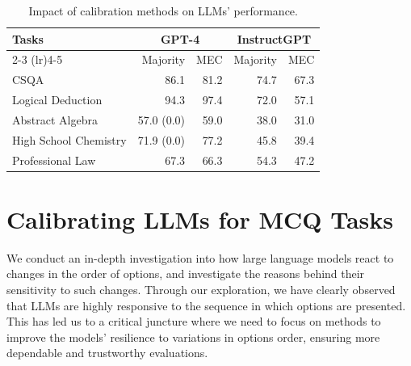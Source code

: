 \documentclass[11pt]{article}
\begin{document}
\begin{table}
\small
\centering
\begin{tabular}{lrrrr}
\toprule 
\bf Tasks& \multicolumn{2}{c}{\bf GPT-4}&  \multicolumn{2}{c}{\bf InstructGPT}\\
\cmidrule(lr){2-3}
\cmidrule(lr){4-5}
&Majority&MEC&Majority&MEC\\
\midrule
CSQA &86.1 \color{cadmiumgreen}{($+1.8$)}& 81.2 \color{cadmiumred}{($-3.1$)}&74.7 \color{cadmiumgreen}{($+2.4$)}&67.3 \color{cadmiumred}{($-5.0$)}\\
Logical Deduction&94.3 \color{cadmiumgreen}{($+2.0$)}&97.4 \color{cadmiumgreen}{($+5.1$)}&72.0 \color{cadmiumgreen}{($+8.0$)}& 57.1 \color{cadmiumred}{($-6.9$)}\\
Abstract Algebra &57.0 ($0.0$)& 59.0 \color{cadmiumgreen}{($+2.0$)}&38.0 \color{cadmiumgreen}{($+5.0$)} & 31.0 \color{cadmiumred}{($-2.0$)}\\
High School Chemistry &71.9 ($0.0$)&77.2 \color{cadmiumgreen}{($+5.3$)}&45.8 \color{cadmiumgreen}{($+1.0$)} &39.4 \color{cadmiumred}{($-5.4$)}\\
Professional Law &67.3 \color{cadmiumgreen}{($+1.2$)}&66.3 \color{cadmiumgreen}{($+0.2$)}&54.3 \color{cadmiumgreen}{($+5.7$)}&47.2 \color{cadmiumred}{($-1.4$)}\\
\bottomrule
\end{tabular}
\caption{Impact of calibration methods on LLMs' performance.}
\label{tab:calib}
\end{table}

\section{Calibrating LLMs for MCQ Tasks}
We conduct an in-depth investigation into how large language models react to changes in the order of options, and investigate the reasons behind their sensitivity to such changes. 
Through our exploration, we have clearly observed that LLMs are highly responsive to the sequence in which options are presented. 
This has led us to a critical juncture where we need to focus on methods to improve the models' resilience to variations in options order, ensuring more dependable and trustworthy evaluations.
\end{document}
